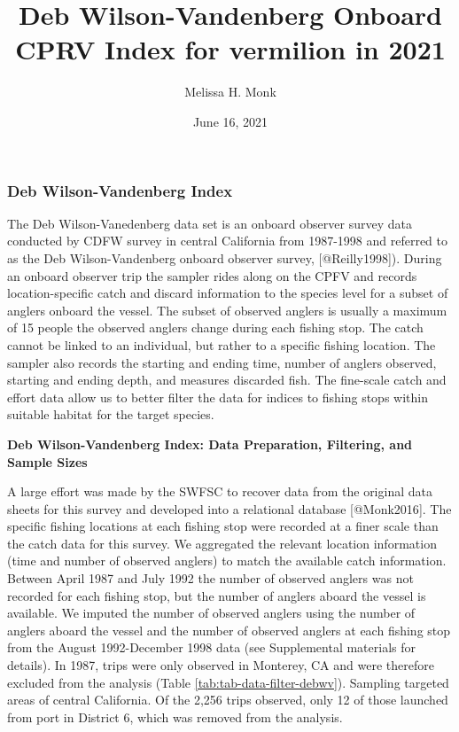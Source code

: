 \documentclass[
]{article}
\title{Deb Wilson-Vandenberg Onboard CPRV Index for vermilion in 2021}
\author{Melissa H. Monk}
\date{June 16, 2021}
\begin{document}
\maketitle

{
\setcounter{tocdepth}{2}
\tableofcontents
}
\hypertarget{deb-wilson-vandenberg-index}{%
\subsubsection{Deb Wilson-Vandenberg Index}\label{deb-wilson-vandenberg-index}}

The Deb Wilson-Vanedenberg data set is an onboard observer survey data conducted
by CDFW survey in central California from 1987-1998 and referred to as the Deb
Wilson-Vandenberg onboard observer survey, {[}@Reilly1998{]}). During an onboard
observer trip the sampler rides along on the CPFV and records location-specific
catch and discard information to the species level for a subset of anglers
onboard the vessel. The subset of observed anglers is usually a maximum of 15
people the observed anglers change during each fishing stop. The catch cannot be
linked to an individual, but rather to a specific fishing location. The sampler
also records the starting and ending time, number of anglers observed, starting
and ending depth, and measures discarded fish. The fine-scale catch and effort
data allow us to better filter the data for indices
to fishing stops within suitable habitat for the target species.

\textbf{Deb Wilson-Vandenberg Index: Data Preparation, Filtering, and Sample Sizes}

A large effort was made by the SWFSC to recover data from the original data
sheets for this survey and developed into a relational database {[}@Monk2016{]}.
The specific fishing locations at each fishing stop were recorded at a finer
scale than the catch data for this survey. We aggregated the relevant location
information (time and number of observed anglers) to match the available catch
information. Between April 1987 and July 1992 the number of observed anglers
was not recorded for each fishing stop, but the number of anglers aboard the
vessel is available. We imputed the number of observed anglers using the number
of anglers aboard the vessel and the number of observed anglers at each fishing
stop from the August 1992-December 1998 data (see Supplemental materials for
details). In 1987, trips were only observed in Monterey, CA and were therefore
excluded from the analysis (Table \ref{tab:tab-data-filter-debwv}). Sampling
targeted areas of central California. Of the 2,256 trips observed, only 12 of
those launched from port in District 6, which was removed from the analysis.
\end{document}
